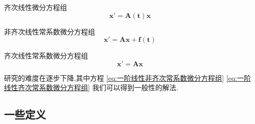 \documentclass{ctexart}
\numberwithin{equation}{subsection}
\begin{document}
齐次线性微分方程组
\begin{equation}
        \label{eq:一阶线性齐次微分方程组}
        \boldsymbol{x}'=\boldsymbol{A(t)x}
\end{equation}

非齐次线性常系数微分方程组
\begin{equation}
        \label{eq:一阶线性非齐次常系数微分方程组}
        \boldsymbol{x}'=\boldsymbol{Ax}+\boldsymbol{f(t)}
\end{equation}

齐次线性常系数微分方程组
\begin{equation}
        \label{eq:一阶线性齐次常系数微分方程组}
        \boldsymbol{x}'=\boldsymbol{Ax}
\end{equation}

研究的难度在逐步下降,其中方程 \eqref{eq:一阶线性非齐次常系数微分方程组} \eqref{eq:一阶线性齐次常系数微分方程组}  我们可以得到一般性的解法.
\subsection{一些定义}
\end{document}
